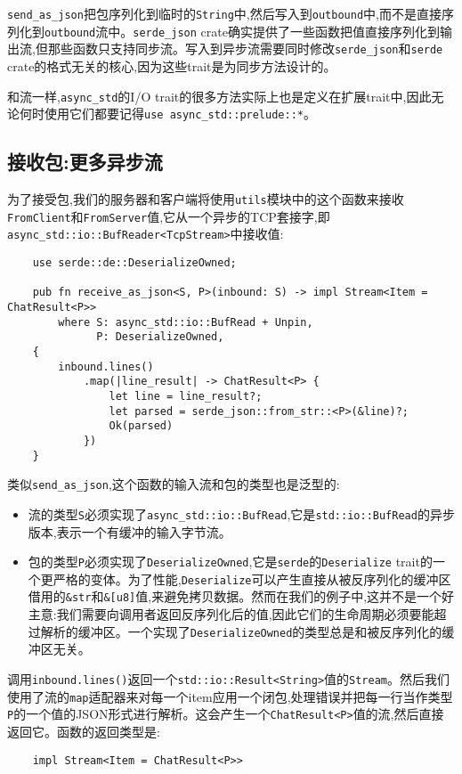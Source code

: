 \texttt{send\_as\_json}把包序列化到临时的\texttt{String}中,然后写入到\texttt{outbound}中,而不是直接序列化到\texttt{outbound}流中。\texttt{serde\_json} crate确实提供了一些函数把值直接序列化到输出流,但那些函数只支持同步流。写入到异步流需要同时修改\texttt{serde\_json}和\texttt{serde} crate的格式无关的核心,因为这些trait是为同步方法设计的。

和流一样,\texttt{async\_std}的I/O trait的很多方法实际上也是定义在扩展trait中,因此无论何时使用它们都要记得\texttt{use async\_std::prelude::*}。

\subsection{接收包:更多异步流}
为了接受包,我们的服务器和客户端将使用\texttt{utils}模块中的这个函数来接收\texttt{FromClient}和\texttt{FromServer}值,它从一个异步的TCP套接字,即\texttt{async\_std::io::BufReader<TcpStream>}中接收值:
\begin{verbatim}
    use serde::de::DeserializeOwned;

    pub fn receive_as_json<S, P>(inbound: S) -> impl Stream<Item = ChatResult<P>>
        where S: async_std::io::BufRead + Unpin,
              P: DeserializeOwned,
    {
        inbound.lines()
            .map(|line_result| -> ChatResult<P> {
                let line = line_result?;
                let parsed = serde_json::from_str::<P>(&line)?;
                Ok(parsed)
            })
    }
\end{verbatim}

类似\texttt{send\_as\_json},这个函数的输入流和包的类型也是泛型的:
\begin{itemize}
    \item 流的类型\texttt{S}必须实现了\texttt{async\_std::io::BufRead},它是\texttt{std::io::BufRead}的异步版本,表示一个有缓冲的输入字节流。
    \item 包的类型\texttt{P}必须实现了\texttt{DeserializeOwned},它是\texttt{serde}的\texttt{Deserialize} trait的一个更严格的变体。为了性能,\texttt{Deserialize}可以产生直接从被反序列化的缓冲区借用的\texttt{\&str}和\texttt{\&[u8]}值,来避免拷贝数据。然而在我们的例子中,这并不是一个好主意:我们需要向调用者返回反序列化后的值,因此它们的生命周期必须要能超过解析的缓冲区。一个实现了\texttt{DeserializeOwned}的类型总是和被反序列化的缓冲区无关。
\end{itemize}

调用\texttt{inbound.lines()}返回一个\texttt{std::io::Result<String>}值的\texttt{Stream}。然后我们使用了流的\texttt{map}适配器来对每一个item应用一个闭包,处理错误并把每一行当作类型\texttt{P}的一个值的JSON形式进行解析。这会产生一个\texttt{ChatResult<P>}值的流,然后直接返回它。函数的返回类型是:
\begin{verbatim}
    impl Stream<Item = ChatResult<P>>
\end{verbatim}

